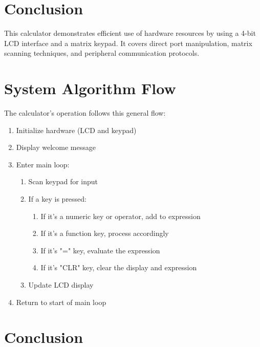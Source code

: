 \documentclass[12pt]{article}
\begin{document}
\section{Conclusion}
This calculator demonstrates efficient use of hardware resources by using a 4-bit LCD interface and a matrix keypad. It covers direct port manipulation, matrix scanning techniques, and peripheral communication protocols.

\section{System Algorithm Flow}

The calculator's operation follows this general flow:
\begin{enumerate}
\item Initialize hardware (LCD and keypad)
\item Display welcome message
\item Enter main loop:
   \begin{enumerate}
   \item Scan keypad for input
   \item If a key is pressed:
      \begin{enumerate}
      \item If it's a numeric key or operator, add to expression
      \item If it's a function key, process accordingly
      \item If it's "=" key, evaluate the expression
      \item If it's "CLR" key, clear the display and expression
      \end{enumerate}
   \item Update LCD display
   \end{enumerate}
\item Return to start of main loop
\end{enumerate}

\section{Conclusion}
\end{document}
